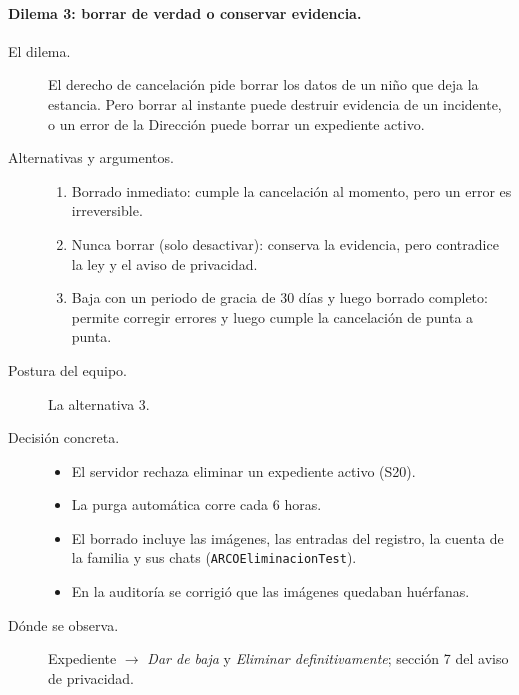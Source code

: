 \paragraph{Dilema 3: borrar de verdad o conservar evidencia.}
\begin{description}
	\item[El dilema.] El derecho de cancelación pide borrar los datos de un niño que deja la estancia. Pero borrar al instante puede destruir evidencia de un incidente, o un error de la Dirección puede borrar un expediente activo.
	\item[Alternativas y argumentos.]
	\begin{enumerate}
		\item Borrado inmediato: cumple la cancelación al momento, pero un error es irreversible.
		\item Nunca borrar (solo desactivar): conserva la evidencia, pero contradice la ley y el aviso de privacidad.
		\item Baja con un periodo de gracia de 30 días y luego borrado completo: permite corregir errores y luego cumple la cancelación de punta a punta.
	\end{enumerate}
	\item[Postura del equipo.] La alternativa 3.
	\item[Decisión concreta.]
	\begin{itemize}
		\item El servidor rechaza eliminar un expediente activo (S20).
		\item La purga automática corre cada 6 horas.
		\item El borrado incluye las imágenes, las entradas del registro, la cuenta de la familia y sus chats (\texttt{ARCOEliminacion\allowbreak{}Test}).
		\item En la auditoría se corrigió que las imágenes quedaban huérfanas.
	\end{itemize}
	\item[Dónde se observa.] Expediente $\rightarrow$ \emph{Dar de baja} y \emph{Eliminar definitivamente}; sección 7 del aviso de privacidad.
\end{description}
